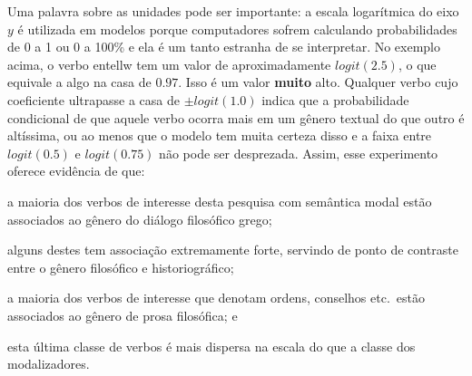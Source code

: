 \documentclass[a4paper,article,12pt,oneside]{memoir}
\begin{document}
Uma palavra sobre as unidades pode ser importante: a escala logarítmica do eixo $y$ é utilizada em modelos porque computadores sofrem calculando probabilidades de 0 a 1 ou 0 a 100\% e ela é um tanto estranha de se interpretar. No exemplo acima, o verbo entellw tem um valor de aproximadamente $logit(2.5)$, o que equivale a algo na casa de $0.97$.
Isso é um valor \textbf{muito} alto.
Qualquer verbo cujo coeficiente ultrapasse a casa de $\pm logit(1.0)$ indica que a probabilidade condicional de que aquele verbo ocorra mais em um gênero textual do que outro é altíssima, ou ao menos que o modelo tem muita certeza disso e a faixa entre $logit(0.5)$ e $logit(0.75)$ não pode ser desprezada.
Assim, esse experimento oferece evidência de que:
\begin{compactenum}
\item a maioria dos verbos de interesse desta pesquisa com semântica modal estão associados ao gênero do diálogo filosófico grego;
\item alguns destes tem associação extremamente forte, servindo de ponto de contraste entre o gênero filosófico e historiográfico;
\item a maioria dos verbos de interesse que denotam ordens, conselhos etc.\ estão associados ao gênero de prosa filosófica; e
\item esta última classe de verbos é mais dispersa na escala do que a classe dos modalizadores.
\end{compactenum}

\printbibliography%
\end{document}
